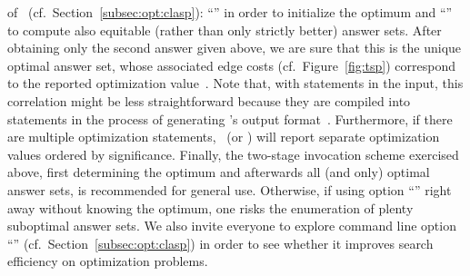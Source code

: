 of \clasp\ (cf.\ Section~\ref{subsec:opt:clasp}):
``'' in order to initialize the optimum and
``'' to compute also equitable
(rather than only strictly better) answer sets.%
After obtaining only the second answer given above,
we are sure that this is the unique optimal answer set,
whose associated edge costs (cf.\ Figure~\ref{fig:tsp}) correspond to
the reported optimization value~.
Note that, with  statements in the input, this correlation
might be less straightforward because they are compiled into 
statements in the process of generating \lparse's output format~\cite{lparseManual}.
Furthermore, if there are multiple optimization statements,
\clasp\ (or \clingo) will report separate optimization values ordered by significance.
Finally, the two-stage invocation scheme exercised above,
first determining the optimum and afterwards all (and only) optimal answer sets,
is recommended for general use.
Otherwise,
if using option ``'' right away without knowing the optimum,
one risks the enumeration of plenty suboptimal answer sets.
We also invite everyone to explore command line option ``''
(cf.\ Section~\ref{subsec:opt:clasp})
in order to see whether it improves search efficiency on optimization problems.



